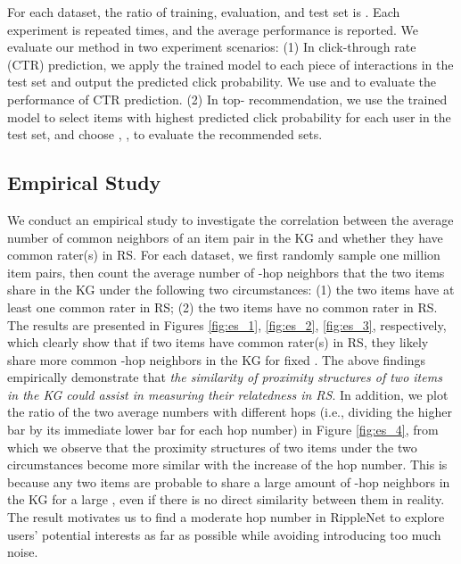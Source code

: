 \documentclass[sigconf]{acmart}
\begin{document}
		For each dataset, the ratio of training, evaluation, and test set is .
		Each experiment is repeated  times, and the average performance is reported.
		We evaluate our method in two experiment scenarios:
		(1) In click-through rate (CTR) prediction, we apply the trained model to each piece of interactions in the test set and output the predicted click probability.
		We use  and  to evaluate the performance of CTR prediction.
		(2) In top- recommendation, we use the trained model to select  items with highest predicted click probability for each user in the test set, and choose , ,  to evaluate the recommended sets.
	
		
	\subsection{Empirical Study}
	\label{sec:es}        
        We conduct an empirical study to investigate the correlation between the average number of common neighbors of an item pair in the KG and whether they have common rater(s) in RS.
		For each dataset, we first randomly sample one million item pairs, then count the average number of -hop neighbors that the two items share in the KG under the following two circumstances: (1) the two items have at least one common rater in RS; (2) the two items have no common rater in RS.
		The results are presented in Figures \ref{fig:es_1}, \ref{fig:es_2}, \ref{fig:es_3}, respectively, which clearly show that if two items have common rater(s) in RS, they likely share more common -hop neighbors in the KG for fixed .
		The above findings empirically demonstrate that \textit{the similarity of proximity structures of two items in the KG could assist in measuring their relatedness in RS}.
		In addition, we plot the ratio of the two average numbers with different hops (i.e., dividing the higher bar by its immediate lower bar for each hop number) in Figure \ref{fig:es_4}, from which we observe that the proximity structures of two items under the two circumstances become more similar with the increase of the hop number.
		This is because any two items are probable to share a large amount of -hop neighbors in the KG for a large , even if there is no direct similarity between them in reality.
		The result motivates us to find a moderate hop number in RippleNet to explore users' potential interests as far as possible while avoiding introducing too much noise.
		
		
\end{document}
